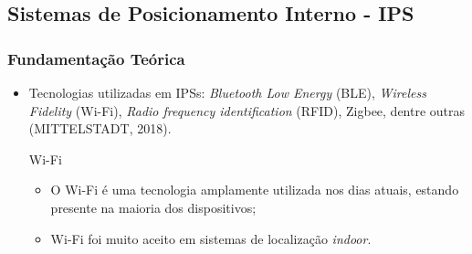 \documentclass[xcolor={dvipsnames,svgnames,table}]{beamer}
\begin{document}
	\subsection{Sistemas de Posicionamento Interno - IPS}
	\label{fundamentacao-sistemas-posicionamento-interno}
	\begin{frame}
		\frametitle{Fundamentação Teórica}
		\begin{itemize}[label=\textcolor{black}{\textbullet}, left=0pt]
			\justifying
			\item {\footnotesize Tecnologias utilizadas em IPSs: \textit{Bluetooth Low Energy} (BLE), \textit{Wireless Fidelity} (Wi-Fi), \textit{Radio frequency identification} (RFID), Zigbee, dentre outras (MITTELSTADT, 2018).}
			\begin{block}{Wi-Fi}
				\begin{itemize}[label=\textcolor{black}{\textbullet}, left=5pt]
					\justifying
					\item O Wi-Fi é uma tecnologia amplamente utilizada nos dias atuais, estando presente na maioria dos dispositivos;
					\item Wi-Fi foi muito aceito em sistemas de localização \textit{indoor}.

\end{itemize}
\end{block}
\end{itemize}
\end{frame}
\end{document}
